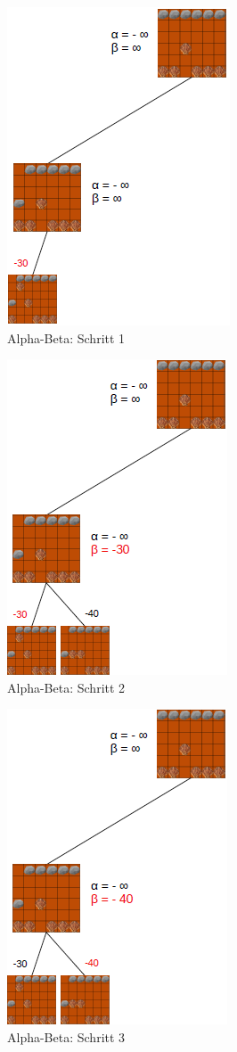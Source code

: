 \begin{figure}[h]
	\centering
	\includegraphics{img/ab1}
	\caption{Alpha-Beta: Schritt 1}
	\label{fig:ab1}
\end{figure}

\begin{figure}[h]
	\centering
	\includegraphics{img/ab2}
	\caption{Alpha-Beta: Schritt 2}
	\label{fig:ab2}
\end{figure}

\begin{figure}[h]
	\centering
	\includegraphics{img/ab3}
	\caption{Alpha-Beta: Schritt 3}
	\label{fig:ab3}
\end{figure}

